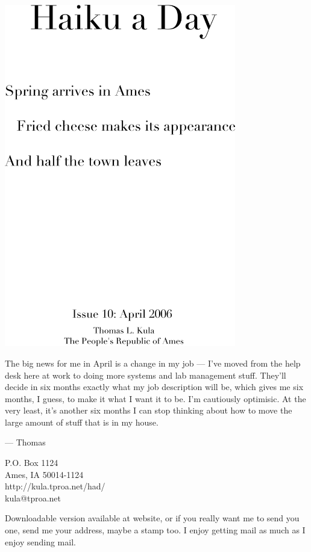 \documentclass[12pt]{article}
\begin{document}
\includegraphics[width=101mm]{frontpage.png}

\newpage

The big news for me in April is a change in my job ---
I've moved from the help desk here at work to doing more
systems and lab management stuff. They'll decide in six
months exactly what my job description will be, which 
gives me six months, I guess, to make it what I want it
to be. I'm cautiously optimisic. At the very least, 
it's another six months I can stop thinking about how
to move the large amount of stuff that is in my house.

--- Thomas

P.O. Box 1124 \\
Ames, IA 50014-1124 \\
http://kula.tproa.net/had/ \\
kula@tproa.net

Downloadable version available at website, or if you really
want me to send you one, send me your address, maybe a
stamp too. I enjoy getting mail as much as I enjoy sending
mail.\\

\setlength{\parskip}{1mm}
\end{document}
